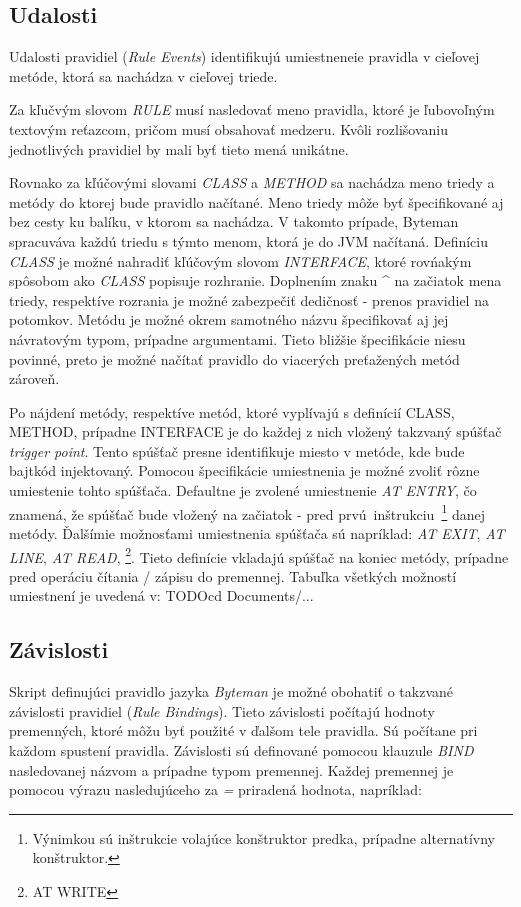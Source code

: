 \documentclass[11pt,final,oneside]{fithesis}
\begin{document}
\subsection{Udalosti}
Udalosti pravidiel (\textit{Rule Events}) identifikujú umiestneneie pravidla v
cieľovej metóde, ktorá sa nachádza v cieľovej triede.

Za kľučvým slovom \textit{RULE} musí nasledovať meno pravidla, ktoré je ľubovoľným textovým reťazcom, pričom musí obsahovať medzeru. Kvôli rozlišovaniu jednotlivých pravidiel by mali byť tieto mená unikátne.

Rovnako za kľúčovými slovami \textit{CLASS} a \textit{METHOD} sa nachádza meno triedy a metódy do ktorej bude pravidlo načítané. Meno triedy môže byť špecifikované aj bez cesty ku balíku, v ktorom sa nachádza. V takomto prípade, Byteman spracuváva každú triedu s týmto menom, ktorá je do JVM načítaná. Definíciu \textit{CLASS} je možné nahradiť kľúčovým slovom
\textit{INTERFACE}, ktoré rovńakým spôsobom ako \textit{CLASS} popisuje rozhranie. Doplnením znaku ^ na začiatok mena triedy, respektíve rozrania je možné zabezpečiť dedičnosť - prenos pravidiel na potomkov. Metódu je možné okrem samotného názvu špecifikovať aj jej návratovým typom, prípadne
argumentami. Tieto bližšie špecifikácie niesu povinné, preto je možné načítať pravidlo do viacerých preťažených metód zároveň.

Po nájdení metódy, respektíve metód, ktoré vyplívajú s definícií CLASS, METHOD, prípadne INTERFACE je do každej z nich vložený takzvaný spúšťač \textit{trigger point}. Tento spúšťač presne identifikuje miesto v metóde, kde bude bajtkód injektovaný. Pomocou špecifikácie umiestnenia je možné zvoliť rôzne umiestenie tohto spúšťača. Defaultne je zvolené umiestnenie \textit{AT ENTRY}, čo znamená, že spúšťač bude vložený na začiatok - pred prvú~inštrukciu~\footnote{Výnimkou sú inštrukcie volajúce konštruktor predka, prípadne alternatívny konštruktor.} danej metódy. Ďalšímie možnosťami umiestnenia spúšťača sú napríklad: \textit{AT EXIT}, \textit{AT LINE}, \textit{AT READ}, \footnote{AT WRITE}. Tieto definície vkladajú spúšťač na koniec metódy, prípadne pred operáciu čítania / zápisu do premennej. Tabuľka všetkých možností umiestnení je uvedená v: TODOcd Documents/...

\subsection{Závislosti}
Skript definujúci  pravidlo jazyka \textit{Byteman} je možné obohatiť o takzvané závislosti pravidiel (\textit{Rule Bindings}). Tieto závislosti počítajú hodnoty premenných, ktoré môžu byť použité v ďalšom tele pravidla. Sú počítane pri každom spustení pravidla. Závislosti sú definované pomocou klauzule \textit{BIND} nasledovanej názvom a prípadne typom premennej. Každej premennej je pomocou výrazu nasledujúceho za \textit{=} priradená hodnota, napríklad:
\end{document}
